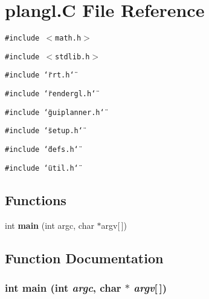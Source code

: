 \section{plangl.C File Reference}
\label{plangl_C}
{\tt \#include $<$math.h$>$}\par
{\tt \#include $<$stdlib.h$>$}\par
{\tt \#include \char`\"{}rrt.h\char`\"{}}\par
{\tt \#include \char`\"{}rendergl.h\char`\"{}}\par
{\tt \#include \char`\"{}guiplanner.h\char`\"{}}\par
{\tt \#include \char`\"{}setup.h\char`\"{}}\par
{\tt \#include \char`\"{}defs.h\char`\"{}}\par
{\tt \#include \char`\"{}util.h\char`\"{}}\par
\subsection*{Functions}
\begin{CompactItemize}
\item 
int {\bf main} (int argc, char $\ast$argv[$\,$])
\end{CompactItemize}


\subsection{Function Documentation}
\subsubsection{\setlength{\rightskip}{0pt plus 5cm}int main (int {\em argc}, char $\ast$ {\em argv}[$\,$])}\label{plangl_C_a0}


